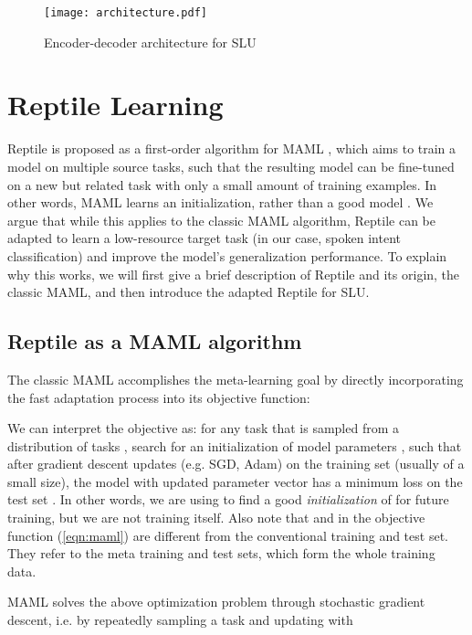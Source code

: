 \documentclass[a4paper]{article}
\begin{document}
	\begin{figure}
		\centering
		\texttt{[image: architecture.pdf]}
		\caption{Encoder-decoder architecture for SLU}
		\label{fig:architecture}
	\end{figure}
	
	
	\section{Reptile Learning}
	Reptile \cite{Reptile} is proposed as a first-order algorithm for MAML \cite{finn2018learning, FinnICML}, which aims to train a model on multiple source tasks, such that the resulting model can be fine-tuned on a new but related task with only a small amount of training examples. In other words, MAML learns an initialization, rather than a good model \cite{gu-etal-2018-meta}. We argue that while this applies to the classic MAML algorithm, Reptile can be adapted to learn a low-resource target task (in our case, spoken intent classification) and improve the model's generalization performance. To explain why this works, we will first give a brief description of Reptile and its origin, the classic MAML, and then introduce the adapted Reptile for SLU.
	
	\subsection{Reptile as a MAML algorithm}
	The classic MAML accomplishes the meta-learning goal by directly incorporating the fast adaptation process into its objective function:
	
	
	
	We can interpret the objective as: for any task  that is sampled from a distribution of tasks , search for an initialization of model parameters , such that after  gradient descent updates (e.g. SGD, Adam) on the training set  (usually of a small size), the model with updated parameter vector  has a minimum loss  on the test set . In other words, we are using  to find a good \emph{initialization} of  for future training, but we are not training  itself.
	Also note that  and  in the objective function (\ref{eqn:maml}) are different from the conventional training and test set. They refer to the meta training and test sets, which form the whole training data.
	
	MAML solves the above optimization problem through stochastic gradient descent, i.e. by repeatedly sampling a task  and updating  with 
	
\end{document}
